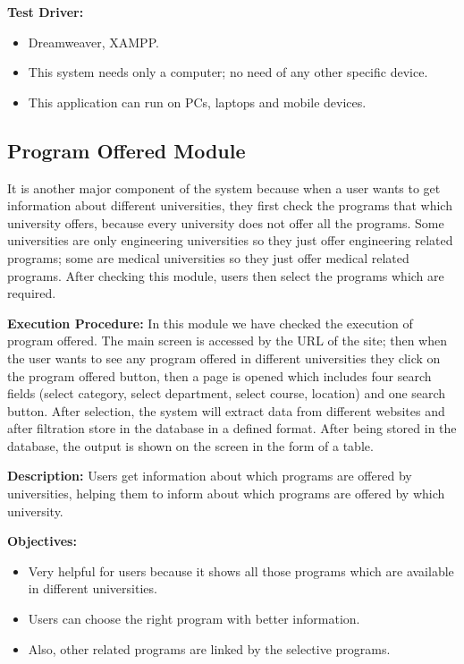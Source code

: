\textbf{Test Driver:}
\begin{itemize}
    \item Dreamweaver, XAMPP.
    \item This system needs only a computer; no need of any other specific device.
    \item This application can run on PCs, laptops and mobile devices.
\end{itemize}

\subsection{Program Offered Module}

It is another major component of the system because when a user wants to get information about different universities, they first check the programs that which university offers, because every university does not offer all the programs. Some universities are only engineering universities so they just offer engineering related programs; some are medical universities so they just offer medical related programs. After checking this module, users then select the programs which are required.

\textbf{Execution Procedure:}
In this module we have checked the execution of program offered. The main screen is accessed by the URL of the site; then when the user wants to see any program offered in different universities they click on the program offered button, then a page is opened which includes four search fields (select category, select department, select course, location) and one search button. After selection, the system will extract data from different websites and after filtration store in the database in a defined format. After being stored in the database, the output is shown on the screen in the form of a table.

\textbf{Description:} Users get information about which programs are offered by universities, helping them to inform about which programs are offered by which university.

\textbf{Objectives:}
\begin{itemize}
    \item Very helpful for users because it shows all those programs which are available in different universities.
    \item Users can choose the right program with better information.
    \item Also, other related programs are linked by the selective programs.
\end{itemize}

